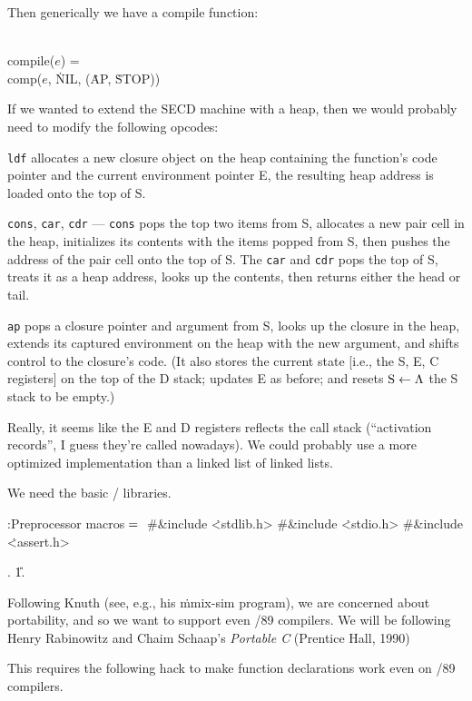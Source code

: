 \bull Then generically we have a compile function:

\\{compile}($e$) = \\{comp}($e$, \.{NIL}, (\.{AP}, \.{STOP}))

\fi

If we wanted to extend the SECD machine with a heap, then we would
probably need to modify the following opcodes:

\bull
{\tt ldf} allocates a new closure object on the heap containing the
function's code pointer and the current environment pointer E, the
resulting heap address is loaded onto the top of S.

\bull
{\tt cons}, {\tt car}, {\tt cdr} --- {\tt cons} pops the top two items
from S, allocates a new pair cell in the heap, initializes its
contents with the items popped from S, then pushes the address of the
pair cell onto the top of S. The {\tt car} and {\tt cdr} pops the top
of S, treats it as a heap address, looks up the contents, then returns
either the head or tail.

\bull
{\tt ap} pops a closure pointer and argument from S, looks up the
closure in the heap, extends its captured environment on the heap with
the new argument, and shifts control to the closure's code. (It also
stores the current state [i.e., the S, E, C registers] on the top of
the D stack; updates E as before; and resets ${\rm S}\gets\Lambda$ the S stack
to be empty.)

\medskip
Really, it seems like the E and D registers reflects the call stack
(``activation records'', I guess they're called nowadays). We could
probably use a more optimized implementation than a linked list of
linked lists.

\fi

We need the basic \CEE/ libraries.

\Y\B\4:Preprocessor macros\X${}={}$\6
\8\#\&{include} \.{<stdlib.h>}\6
\8\#\&{include} \.{<stdio.h>}\6
\8\#\&{include} \.{<assert.h>}\par
{}.
\U1.\fi

Following Knuth (see, e.g., his \.{mmix-sim} program), we are
concerned about portability, and so we want to support even \CEE/89
compilers. We will be following Henry Rabinowitz and Chaim Schaap's
{\it Portable C} (Prentice Hall, 1990)

This requires the following hack to make function
declarations work even on \CEE/89 compilers.

